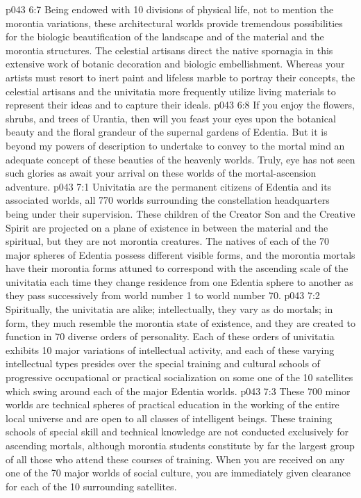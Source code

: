 \vs p043 6:7 Being endowed with 10 divisions of physical life, not to mention the morontia variations, these architectural worlds provide tremendous possibilities for the biologic beautification of the landscape and of the material and the morontia structures. The celestial artisans direct the native spornagia in this extensive work of botanic decoration and biologic embellishment. Whereas your artists must resort to inert paint and lifeless marble to portray their concepts, the celestial artisans and the univitatia more frequently utilize living materials to represent their ideas and to capture their ideals.
\vs p043 6:8 If you enjoy the flowers, shrubs, and trees of Urantia, then will you feast your eyes upon the botanical beauty and the floral grandeur of the supernal gardens of Edentia. But it is beyond my powers of description to undertake to convey to the mortal mind an adequate concept of these beauties of the heavenly worlds. Truly, eye has not seen such glories as await your arrival on these worlds of the mortal\hyp{}ascension adventure.
\vs p043 7:1 Univitatia are the permanent citizens of Edentia and its associated worlds, all 770 worlds surrounding the constellation headquarters being under their supervision. These children of the Creator Son and the Creative Spirit are projected on a plane of existence in between the material and the spiritual, but they are not morontia creatures. The natives of each of the 70 major spheres of Edentia possess different visible forms, and the morontia mortals have their morontia forms attuned to correspond with the ascending scale of the univitatia each time they change residence from one Edentia sphere to another as they pass successively from world number 1 to world number 70.
\vs p043 7:2 Spiritually, the univitatia are alike; intellectually, they vary as do mortals; in form, they much resemble the morontia state of existence, and they are created to function in 70 diverse orders of personality. Each of these orders of univitatia exhibits 10 major variations of intellectual activity, and each of these varying intellectual types presides over the special training and cultural schools of progressive occupational or practical socialization on some one of the 10 satellites which swing around each of the major Edentia worlds.
\vs p043 7:3 These 700 minor worlds are technical spheres of practical education in the working of the entire local universe and are open to all classes of intelligent beings. These training schools of special skill and technical knowledge are not conducted exclusively for ascending mortals, although morontia students constitute by far the largest group of all those who attend these courses of training. When you are received on any one of the 70 major worlds of social culture, you are immediately given clearance for each of the 10 surrounding satellites.
